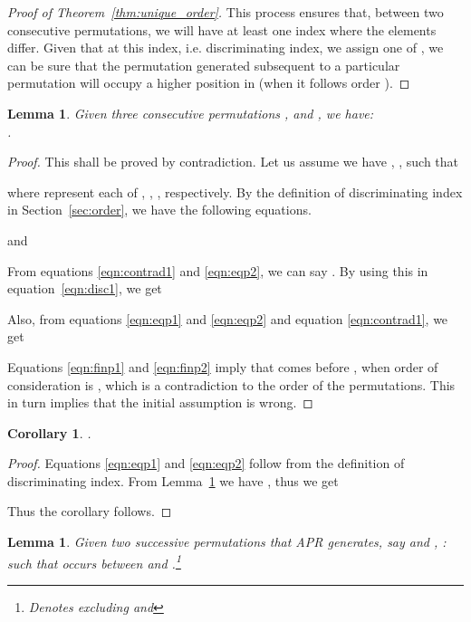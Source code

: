 \documentclass{article}
\newtheorem{lemma}[defn]{Lemma}
\newtheorem{corollary}[defn]{Corollary}
\begin{document}
\begin{proof}[Proof of Theorem~\ref{thm:unique_order}]
This process ensures that, between two consecutive permutations, we will have at least one index where the elements differ. Given that at this index, i.e. discriminating index, we assign one of , we can be sure that the permutation generated subsequent to a particular permutation will occupy a higher position in  (when it follows order ). \end{proof}

\begin{lemma}
\label{lemma:disc}
 Given three consecutive permutations ,  and , we have: \\ .
\end{lemma}

\begin{proof}
 This shall be proved by contradiction. Let us assume we have , ,  such that

where  represent each of , , , respectively. By the definition of discriminating index in Section~\ref{sec:order}, we have the following equations.

and

From equations \ref{eqn:contrad1} and \ref{eqn:eqp2},  we can say . By using this in equation~\ref{eqn:disc1}, we get

Also, from equations \ref{eqn:eqp1} and \ref{eqn:eqp2} and equation \ref{eqn:contrad1}, we get

Equations \ref{eqn:finp1} and \ref{eqn:finp2} imply that  comes before , when order of consideration is , which is a contradiction to the order of the permutations. This in turn implies that the initial assumption is wrong. \end{proof}

\begin{corollary}
\label{corr:disc}
.
\end{corollary}

\begin{proof}
 Equations \ref{eqn:eqp1} and \ref{eqn:eqp2} follow from the definition of discriminating index. From Lemma~\ref{lemma:disc} we have , thus we get

Thus the corollary follows. \end{proof}

\begin{lemma}
\label{lemma:nextperm}
 Given two successive permutations that APR generates, say  and , : such that  occurs between  and .\footnote{ Denotes  excluding  and }
\end{lemma}
\end{document}
